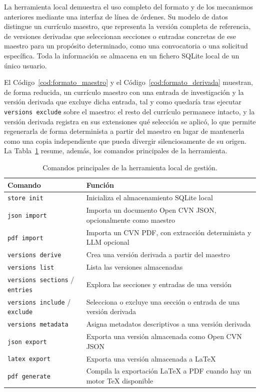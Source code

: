 La herramienta local demuestra el uso completo del formato y de los
mecanismos anteriores mediante una interfaz de línea de órdenes. Su modelo de
datos distingue un currículo maestro, que representa la versión completa de
referencia, de versiones derivadas que seleccionan secciones o entradas
concretas de ese maestro para un propósito determinado, como una
convocatoria o una solicitud específica. Toda la información se almacena en
un fichero SQLite local de un único usuario.

El Código~\ref{cod:formato_maestro} y el Código~\ref{cod:formato_derivada}
muestran, de forma reducida, un currículo maestro con una entrada de
investigación y la versión derivada que excluye dicha entrada, tal y como
quedaría tras ejecutar \texttt{versions exclude} sobre el maestro: el resto
del currículo permanece intacto, y la versión derivada registra en sus
extensiones qué selección se aplicó, lo que permite regenerarla de forma
determinista a partir del maestro en lugar de mantenerla como una copia
independiente que pueda divergir silenciosamente de su origen. La
Tabla~\ref{tab:formato_comandos} resume, además, los comandos principales de
la herramienta.

\begin{table}[htbp]
  \centering
  \footnotesize
  \renewcommand{\arraystretch}{1.45}
  \caption{Comandos principales de la herramienta local de gestión.}
  \label{tab:formato_comandos}
  \begin{tabular}{p{} p{}}
    \hline
    \textbf{Comando} & \textbf{Función} \\
    \hline
    \texttt{store init} & Inicializa el almacenamiento SQLite local \\
    \texttt{json import} & Importa un documento Open CVN JSON, opcionalmente como maestro \\
    \texttt{pdf import} & Importa un CVN PDF, con extracción determinista y LLM opcional \\
    \texttt{versions derive} & Crea una versión derivada a partir del maestro \\
    \texttt{versions list} & Lista las versiones almacenadas \\
    \texttt{versions sections} / \texttt{entries} & Explora las secciones y entradas de una versión \\
    \texttt{versions include} / \texttt{exclude} & Selecciona o excluye una sección o entrada de una versión derivada \\
    \texttt{versions metadata} & Asigna metadatos descriptivos a una versión derivada \\
    \texttt{json export} & Exporta una versión almacenada como Open CVN JSON \\
    \texttt{latex export} & Exporta una versión almacenada a LaTeX \\
    \texttt{pdf generate} & Compila la exportación LaTeX a PDF cuando hay un motor TeX disponible \\
    \hline
  \end{tabular}
\end{table}

